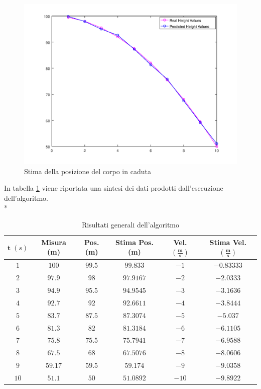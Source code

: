 \begin{figure}[h]
	\centering
	\includegraphics[scale=0.7]{img/predheight}
	\caption{Stima della posizione del corpo in caduta}
	\label{fig:predheight}
\end{figure}
\newpage
In tabella \ref{tab:syntex} viene riportata una sintesi dei dati prodotti dall'esecuzione dell'algoritmo.\\*
\begin{table}[h]
	\begin{tabular}{|c|c|c|c|c|c|}
		\hline 
		$\mathbf{t}\;(s)$ & \textbf{Misura (m)} & \textbf{Pos.(m)} & \textbf{Stima Pos. (m)} & \textbf{Vel.} $\mathbf{\left(\frac{m}{s}\right)}$ & \textbf{Stima Vel.} $\mathbf{\left(\frac{m}{s}\right)}$ \\ 
		\hline 
		$1$ & $100$ & $99.5$ & $99.833$ & $-1$ & $-0.83333$ \\ 
		\hline 
		$2$ & $97.9$ & $98$ & $97.9167$ & $-2$ & $-2.0333$ \\ 
		\hline 
		$3$ & $94.9$ & $95.5$ & $94.9545$ & $-3$ & $-3.1636$ \\ 
		\hline 
		$4$ & $92.7$ & $92$ & $92.6611$ & $-4$ & $-3.8444$ \\ 
		\hline 
		$5$ & $83.7$ & $87.5$ & $87.3074$ & $-5$ & $-5.037$ \\ 
		\hline 
		$6$ & $81.3$ & $82$ & $81.3184$ & $-6$ & $-6.1105$ \\ 
		\hline 
		$7$ & $75.8$ & $75.5$ & $75.7941$ & $-7$ & $-6.9588$ \\ 
		\hline 
		$8$ & $67.5$ & $68$ & $67.5076$ & $-8$ & $-8.0606$ \\ 
		\hline 
		$9$ & $59.17$ & $59.5$ & $59.174$ & $-9$ & $-9.0358$ \\ 
		\hline 
		$10$ & $51.1$ & $50$ & $51.0892$ & $-10$ & $-9.8922$ \\ 
		\hline 
	\end{tabular} 
	\caption{Risultati generali dell'algoritmo}
	\label{tab:syntex}
\end{table}
